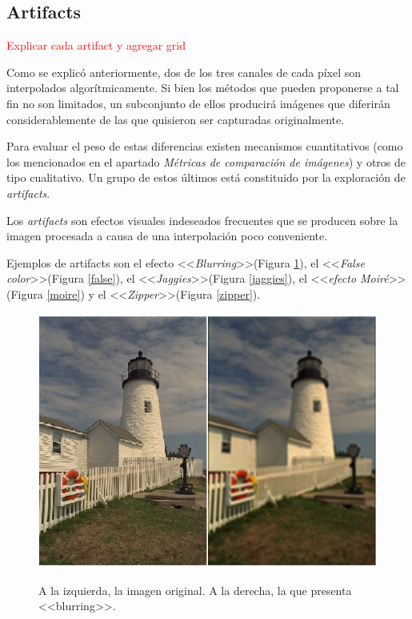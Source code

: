 \documentclass[a4paper]{article}
\begin{document}
\newpage
\subsection{Artifacts}
\textcolor{red}{Explicar cada artifact y agregar grid}

Como se explicó anteriormente, dos de los tres canales de cada p\'ixel son interpolados algorítmicamente. Si bien los métodos que pueden proponerse a tal fin no son limitados, un subconjunto de ellos producirá imágenes que diferirán considerablemente de las que quisieron ser capturadas originalmente. 

Para evaluar el peso de estas diferencias  existen mecanismos cuantitativos (como los mencionados en el apartado \emph{M\'etricas de comparaci\'on de im\'agenes}) y otros de tipo cualitativo. Un grupo de estos últimos está constituido por la exploración de \textit{artifacts}.

Los \textit{artifacts} son efectos visuales indeseados frecuentes que se producen sobre la imagen procesada a causa de una interpolación poco conveniente. 

Ejemplos de artifacts son el efecto <<\emph{Blurring}>>(Figura \ref{blurring}), el <<\emph{False color}>>(Figura \ref{false}), el <<\emph{Jaggies}>>(Figura \ref{jaggies}),   el <<\emph{efecto Moiré}>>(Figura \ref{moire}) y el <<\emph{Zipper}>>(Figura \ref{zipper}).


\begin{figure}[h!]
	\caption{A la izquierda, la imagen original. A la derecha, la que presenta <<blurring>>.}
	\begin{center}
	\includegraphics[scale=0.66]{imagenes/blurring}
	\label{blurring}
  \end{center}
\end{figure}
\end{document}
